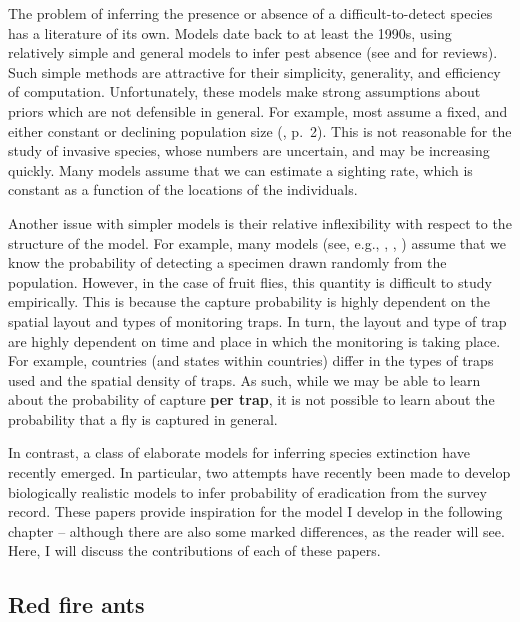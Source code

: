 \documentclass[
  oneside]{book}
\begin{document}
The problem of inferring the presence or absence of a difficult-to-detect species has a literature of its own. Models date back to at least the 1990s, using relatively simple and general models to infer pest absence (see \citet{boakes2015} and \citet{caley2014} for reviews). Such simple methods are attractive for their simplicity, generality, and efficiency of computation. Unfortunately, these models make strong assumptions about priors which are not defensible in general. For example, most assume a fixed, and either constant or declining population size (\citet{caley2015}, p.~2). This is not reasonable for the study of invasive species, whose numbers are uncertain, and may be increasing quickly. Many models assume that we can estimate a sighting rate, which is constant as a function of the locations of the individuals.

Another issue with simpler models is their relative inflexibility with respect to the structure of the model. For example, many models (see, e.g., \citet{mcardle}, \citet{barnes}, \citet{boakes}) assume that we know the probability of detecting a specimen drawn randomly from the population. However, in the case of fruit flies, this quantity is difficult to study empirically. This is because the capture probability is highly dependent on the spatial layout and types of monitoring traps. In turn, the layout and type of trap are highly dependent on time and place in which the monitoring is taking place. For example, countries (and states within countries) differ in the types of traps used and the spatial density of traps. As such, while we may be able to learn about the probability of capture \textbf{per trap}, it is not possible to learn about the probability that a fly is captured in general.

In contrast, a class of elaborate models for inferring species extinction have recently emerged. In particular, two attempts have recently been made to develop biologically realistic models to infer probability of eradication from the survey record. These papers provide inspiration for the model I develop in the following chapter -- although there are also some marked differences, as the reader will see. Here, I will discuss the contributions of each of these papers.

\hypertarget{red-fire-ants}{%
\subsection{Red fire ants}\label{red-fire-ants}}
\end{document}
